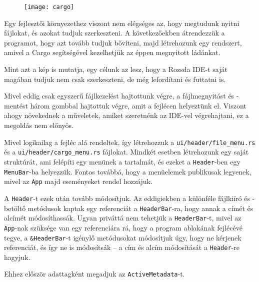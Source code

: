 
\begin{figure}[h]
    \texttt{[image: cargo]}
    \centering
\end{figure}

Egy fejlesztői környezethez viszont nem elégséges az, hogy megtudunk nyitni fájlokat,
és azokat tudjuk szerkeszteni.
A következőekben átrendezzük a programot, hogy azt tovább tudjuk bővíteni,
majd létrehozunk egy rendszert, amivel a Cargo segítségével kezelhetjük az éppen
megnyitott ládánkat.

Mint azt a kép is mutatja, egy célunk az lesz, hogy a Rozsda IDE-t saját magában
tudjuk nem csak szerkeszteni, de még lefordítani és futtatni is.


Mivel eddig csak egyszerű fájlkezelést hajtottunk végre, a fájlmegnyitást és -mentést
három gombbal hajtottuk végre, amit a fejlécen helyeztünk el.
Viszont ahogy növekednek a műveletek, amiket szeretnénk az IDE-vel végrehajtani,
ez a megoldás nem előnyös.

Mivel logikailag a fejléc alá rendeltek, így létrehozzuk a 
\texttt{ui/header/file\_menu.rs} és a \texttt{ui/header/cargo\_menu.rs} fájlokat.
Mindkét esetben létrehozunk egy saját struktúrát, ami felépíti egy menünek a tartalmát,
és ezeket a \texttt{Header}-ben egy \texttt{MenuBar}-ba helyezzük.
Fontos továbbá, hogy a menüelemek publikusak legyenek, mivel az \texttt{App} majd
eseményeket rendel hozzájuk.



A \texttt{Header}-t ezek után tovább módosítjuk.
Az eddigiekben a különféle fájlkiíró és -betöltő metódusok kaptak egy referenciát a
\texttt{HeaderBar}-ra, hogy annak a címét és alcímét módosíthassák.
Ugyan priváttá nem tehetjük a \texttt{HeaderBar}-t, mivel az \texttt{App}-nak szüksége
van egy referenciára rá, hogy a program ablakának fejlécévé tegye,
a \texttt{\&HeaderBar}-t igénylő metódusokat módosítjuk úgy, hogy ne kérjenek referenciát,
és így ne is módosítsák -- a cím és alcím módosítását a \texttt{Header}-re hagyjuk.

Ehhez először adattagként megadjuk az \texttt{ActiveMetadata}-t.



